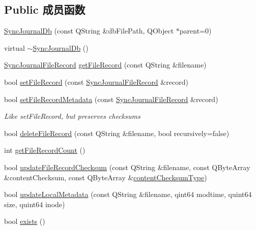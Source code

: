 \subsection*{Public 成员函数}
\begin{DoxyCompactItemize}
\item 
\hyperlink{class_o_c_c_1_1_sync_journal_db_a1335b544f6e170d466a21a739e0aea96}{Sync\+Journal\+Db} (const Q\+String \&db\+File\+Path, Q\+Object $\ast$parent=0)
\item 
virtual \hyperlink{class_o_c_c_1_1_sync_journal_db_a305a2bd1df1bbcaaffa4ba3744521bcd}{$\sim$\+Sync\+Journal\+Db} ()
\item 
\hyperlink{class_o_c_c_1_1_sync_journal_file_record}{Sync\+Journal\+File\+Record} \hyperlink{class_o_c_c_1_1_sync_journal_db_a43d7f9c88a73d50ec0324b8549a857ef}{get\+File\+Record} (const Q\+String \&filename)
\item 
bool \hyperlink{class_o_c_c_1_1_sync_journal_db_a7cda6a2adf1377b4a45f97cc2709c6fe}{set\+File\+Record} (const \hyperlink{class_o_c_c_1_1_sync_journal_file_record}{Sync\+Journal\+File\+Record} \&record)
\item 
bool \hyperlink{class_o_c_c_1_1_sync_journal_db_a8e993d611a0de32fa32c478efd629474}{set\+File\+Record\+Metadata} (const \hyperlink{class_o_c_c_1_1_sync_journal_file_record}{Sync\+Journal\+File\+Record} \&record)
\begin{DoxyCompactList}\small\item\em Like set\+File\+Record, but preserves checksums \end{DoxyCompactList}\item 
bool \hyperlink{class_o_c_c_1_1_sync_journal_db_aa563a639f4347a39658070eb430e4fee}{delete\+File\+Record} (const Q\+String \&filename, bool recursively=false)
\item 
int \hyperlink{class_o_c_c_1_1_sync_journal_db_ac51cba5b6c8d89f470c33758c2d24517}{get\+File\+Record\+Count} ()
\item 
bool \hyperlink{class_o_c_c_1_1_sync_journal_db_a9ebef1639495b1e4a3a1020398398e3e}{update\+File\+Record\+Checksum} (const Q\+String \&filename, const Q\+Byte\+Array \&content\+Checksum, const Q\+Byte\+Array \&\hyperlink{namespace_o_c_c_a6341c56b4b72b2fcc60449285f9f7c38}{content\+Checksum\+Type})
\item 
bool \hyperlink{class_o_c_c_1_1_sync_journal_db_a10e0e51ee7737909a9819752809ea29d}{update\+Local\+Metadata} (const Q\+String \&filename, qint64 modtime, quint64 size, quint64 inode)
\item 
bool \hyperlink{class_o_c_c_1_1_sync_journal_db_ace634d7c2f7e3e95a14c1fa8611ea215}{exists} ()

\end{DoxyCompactItemize}
